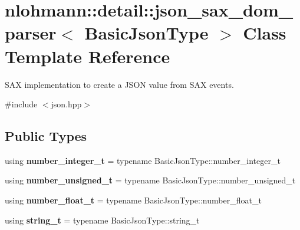 \hypertarget{classnlohmann_1_1detail_1_1json__sax__dom__parser}{}\section{nlohmann\+:\+:detail\+:\+:json\+\_\+sax\+\_\+dom\+\_\+parser$<$ Basic\+Json\+Type $>$ Class Template Reference}
\label{classnlohmann_1_1detail_1_1json__sax__dom__parser}


S\+AX implementation to create a J\+S\+ON value from S\+AX events.  




{\ttfamily \#include $<$json.\+hpp$>$}

\subsection*{Public Types}
\begin{DoxyCompactItemize}
\item 
\mbox{\label{classnlohmann_1_1detail_1_1json__sax__dom__parser_a3d5cd67d179aa7422ce90e54984a441e}} 
using {\bfseries number\+\_\+integer\+\_\+t} = typename Basic\+Json\+Type\+::number\+\_\+integer\+\_\+t
\item 
\mbox{\label{classnlohmann_1_1detail_1_1json__sax__dom__parser_a90f19b272530a479db81db11be2ea15c}} 
using {\bfseries number\+\_\+unsigned\+\_\+t} = typename Basic\+Json\+Type\+::number\+\_\+unsigned\+\_\+t
\item 
\mbox{\label{classnlohmann_1_1detail_1_1json__sax__dom__parser_ad8da3aad0147b18b3cb76868480300fe}} 
using {\bfseries number\+\_\+float\+\_\+t} = typename Basic\+Json\+Type\+::number\+\_\+float\+\_\+t
\item 
\mbox{\label{classnlohmann_1_1detail_1_1json__sax__dom__parser_afd4d961ab2a6b01cbe6e840f7fb90cdc}} 
using {\bfseries string\+\_\+t} = typename Basic\+Json\+Type\+::string\+\_\+t
\end{DoxyCompactItemize}
